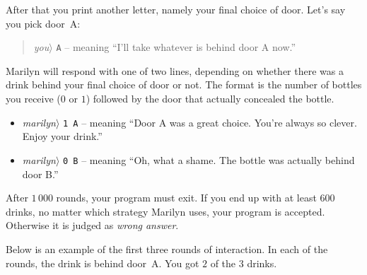 After that you print another letter, namely your final choice of door.
Let's say you pick door~A:
\begin{quote}
  \emph{you}$\rangle$ \verb|A| -- meaning ``I'll take whatever is behind door A now.'' 
\end{quote}
Marilyn will respond with one of two lines, depending on whether there was a drink behind your final choice of door or not.
The format is the number of bottles you receive ($0$ or $1$) followed by the door that actually concealed the bottle.
\begin{itemize}
  \item \emph{marilyn}$\rangle$ \verb|1 A| -- meaning ``Door A  was a great choice. You're always so clever. Enjoy your drink.''
\item \emph{marilyn}$\rangle$ \verb|0 B| -- meaning ``Oh, what a shame. The bottle was actually behind door B.''
\end{itemize}
After $1\,000$ rounds, your program must exit. 
If you end up with at least $600$ drinks, no matter which strategy Marilyn uses, your program is accepted.
Otherwise it is judged as \emph{wrong answer}.

\medskip
Below is an example of the first three rounds of interaction.
In each of the rounds, the drink is behind door~A.
You got $2$ of the $3$ drinks.
